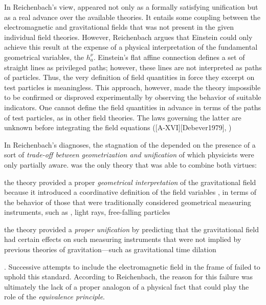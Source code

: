 \documentclass[draft]{article}
\newcommand{\hbein}{\ensuremath{h_{a}^{\nu}}\xspace}
\newcommand{\FP}{\german{Fernparallelismus}\xspace}
\begin{document}
In Reichenbach's view, \FP appeared not only as a formally satisfying unification but as a real advance over the available theories. It entails some coupling between the electromagnetic and gravitational fields that was not present in the given individual field theories. However, Reichenbach argues that Einstein could only achieve this result at the expense of a physical interpretation of the fundamental geometrical variables, the \hbein. Einstein's flat affine connection defines a set of straight lines as privileged paths; however, these lines are not interpreted as paths of particles. Thus, the very definition of field quantities in force they excerpt on test particles is meaningless. This approach, however, made the theory impossible to be confirmed or disproved experimentally by observing the behavior of suitable indicators. One cannot define the field quantities in advance in terms of the paths of test particles, as in other field theories. The laws governing the latter are unknown before integrating the field equations ([A-XVI][Debever1979], \citep[23]{Einstein1930i})





In Reichenbach's diagnoses, the stagnation of the \uftp depended on the presence of a sort of \emph{trade-off between geometrization and unification} of which physicists were only partially aware. \Gr was the only theory that was able to combine both virtues: \begin{inparaenum}[(1)] \item the theory provided a proper \emph{geometrical interpretation} of the gravitational field because it introduced a coordinative definition of the field variables \gmn, in terms of the behavior of those that were traditionally considered geometrical measuring instruments, such as \rac, light rays, free-falling particles \item the theory provided a \emph{proper unification} by predicting that the gravitational field had certain effects on such measuring instruments that were not implied by previous theories of gravitation---such as gravitational time dilation \end{inparaenum} \citep[350]{Reichenbach1928}. Successive attempts to include the electromagnetic field in the frame of \gr failed to uphold this standard. 
According to Reichenbach, the reason for this failure was ultimately the lack of a proper analogon of a physical fact that could play the role of the \emph{equivalence principle}. 
\end{document}
